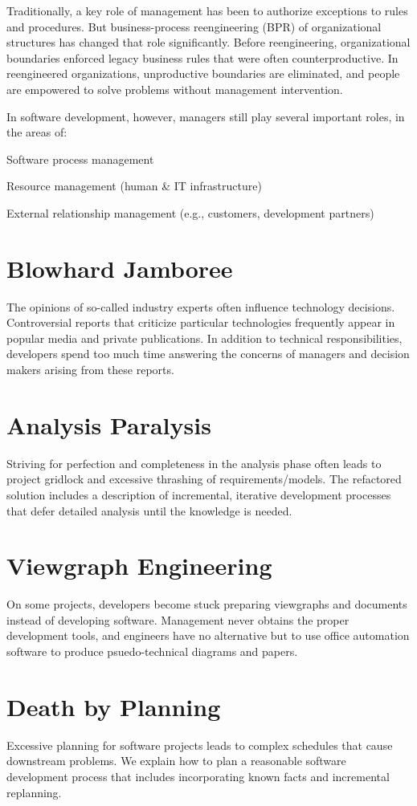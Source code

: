 \documentclass{book}
\begin{document}
Traditionally, a key role of management has been to authorize exceptions to rules and procedures.
But business-process reengineering (BPR) of organizational structures has changed that role significantly.
Before reengineering, organizational boundaries enforced legacy business rules that were often counterproductive.
In reengineered organizations, unproductive boundaries are eliminated, and people are empowered to solve problems without management intervention.

In software development, however, managers still play several important roles, in the areas of:

    Software process management

    Resource management (human \& IT infrastructure)

    External relationship management (e.g., customers, development partners)

\chapter{Blowhard Jamboree}
The opinions of so-called industry experts often influence technology decisions.
Controversial reports that criticize particular technologies frequently appear in popular media and private publications.
In addition to technical responsibilities, developers spend too much time answering the concerns of managers and decision makers arising from these reports.
\chapter{Analysis Paralysis}
Striving for perfection and completeness in the analysis phase often leads to project gridlock and excessive thrashing of requirements/models.
The refactored solution includes a description of incremental, iterative development processes that defer detailed analysis until the knowledge is needed.
\chapter{Viewgraph Engineering}
On some projects, developers become stuck preparing viewgraphs and documents instead of developing software.
Management never obtains the proper development tools, and engineers have no alternative but to use office automation software to produce psuedo-technical diagrams and papers.
\chapter{Death by Planning}
Excessive planning for software projects leads to complex schedules that cause downstream problems.
We explain how to plan a reasonable software development process that includes incorporating known facts and incremental replanning.
\end{document}
